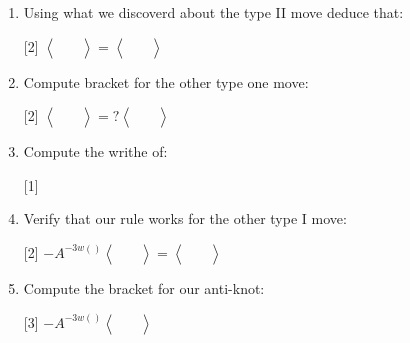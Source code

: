 \documentclass[14pt]{extarticle}
\newcommand{\LP}{\left(}
\newcommand{\RP}{\right)}
\newcommand{\LA}{\left\langle}
\newcommand{\RA}{\right\rangle}
\newcommand{\img}[1]{\begin{aligned}
    &\ \\
    &\\
    &\
\end{aligned}}
\newcommand{\bkt}[1]{\LA\img{#1}\RA}
\begin{document}
\pagestyle{fancy}
\fancyhf{}


\begin{enumerate}
\item{
Using what we discoverd about the type II move deduce that:
\vspace{-2cm}
\begin{center}
\scalebox{2}[2]{
$\bkt{1.svg}=\bkt{6.svg}$
}
\end{center}
}
\vspace{5cm}

\item{
Compute bracket for the other type one move:
\vspace{-2cm}
\begin{center}
\scalebox{2}[2]{
    ${\LA\img{t1.svg}\RA=?\LA\img{t1_2.svg}\RA}$
    }
\end{center}
}
\newpage


\item{
Compute the writhe of:
\begin{center}
    \scalebox{1}[1]{
        $$
        }
\end{center}}

\vspace{5cm}
\item{
Verify that our rule works for the other type I move:
\vspace{-1cm}
\begin{center}
    \scalebox{2}[2]{
        $-A^{-3w\LP \RP}\LA\img{t1.svg}\RA=\LA\img{t1_2.svg}\RA$
        }
\end{center}}
\newpage
\item{
Compute the bracket for our anti-knot:
\vspace{-3cm}
\begin{center}
    \scalebox{3}[3]{
        $-A^{-3w\LP \RP}\LA\img{right.svg}\RA$
        }
\end{center}}
\end{enumerate}
\newpage
\end{document}

